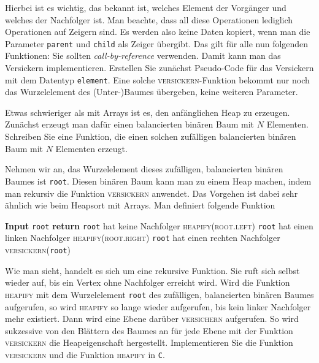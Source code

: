 \documentclass[tikz,12pt]{article}
\begin{document}
Hierbei ist es wichtig, das bekannt ist, welches Element der Vorgänger und welches der Nachfolger ist. 
Man beachte, dass all diese Operationen lediglich Operationen auf Zeigern sind. 
Es werden also keine Daten kopiert, wenn man die Parameter \texttt{parent} und \texttt{child} als Zeiger übergibt.
Das gilt für alle nun folgenden Funktionen: Sie sollten \emph{call-by-reference} verwenden.
Damit kann man das Versickern implementieren.
Erstellen Sie zunächst Pseudo-Code für das Versickern mit dem Datentyp \texttt{element}.
Eine solche \textsc{versickern}-Funktion bekommt nur noch das Wurzelelement des (Unter-)Baumes übergeben, keine weiteren Parameter.

Etwas schwieriger als mit Arrays ist es, den anfänglichen Heap zu erzeugen.
Zunächst erzeugt man dafür einen balancierten binären Baum mit $N$ Elementen.
Schreiben Sie eine Funktion, die einen solchen zufälligen balancierten binären Baum mit $N$ Elementen erzeugt.

Nehmen wir an, das Wurzelelement dieses zufälligen, balancierten binären Baumes ist \texttt{root}.
Diesen binären Baum kann man zu einem Heap machen, indem man rekursiv die Funktion \textsc{versickern} anwendet.
Das Vorgehen ist dabei sehr ähnlich wie beim Heapsort mit Arrays.
Man definiert folgende Funktion
\begin{algorithmic}[1]
  \State\textbf{Input} \texttt{root}
  \State\textbf{return}
  \Comment \texttt{root} hat keine Nachfolger
  \Else
  \State\textsc{heapify}(\textsc{root.left})
  \Comment \texttt{root} hat einen linken Nachfolger
  \EndIf
  \State\textsc{heapify}(\textsc{root.right})
  \Comment \texttt{root} hat einen rechten Nachfolger
  \EndIf
  \State\textsc{versickern}(\texttt{root})
  \EndProcedure
\end{algorithmic}
Wie man sieht, handelt es sich um eine rekursive Funktion.
Sie ruft sich selbst wieder auf, bis ein Vertex ohne Nachfolger erreicht wird.
Wird die Funktion \textsc{heapify} mit dem Wurzelelement \texttt{root} des zufälligen, balancierten binären Baumes aufgerufen, so wird \textsc{heapify} so lange wieder aufgerufen, bis kein linker Nachfolger mehr existiert.
Dann wird eine Ebene darüber \textsc{versichern} aufgerufen.
So wird sukzessive von den Blättern des Baumes an für jede Ebene mit der Funktion \textsc{versickern} die Heapeigenschaft hergestellt. 
Implementieren Sie die Funktion \textsc{versickern} und die Funktion \textsc{heapify} in \texttt{C}.
\end{document}
